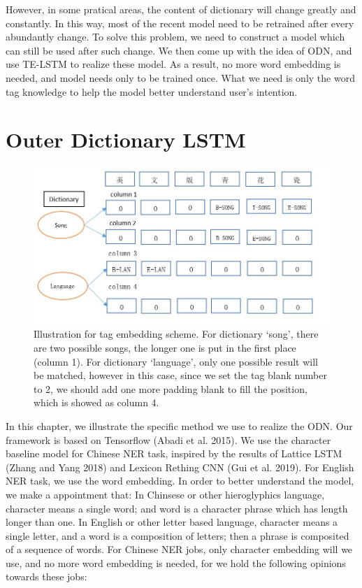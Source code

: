 \documentclass[letterpaper]{article} %
\begin{document}
However, in some pratical areas, the content of dictionary will change greatly and constantly. In this way, most of the recent model need to be retrained after every abundantly change. To solve this problem, we need to construct a model which can still be used after such change. We then come up with the idea of ODN, and use TE-LSTM to realize these model. As a result, no more word embedding is needed, and model needs only to be trained once.  What we need is only the word tag knowledge to help the model better understand user's intention.

\section{Outer Dictionary LSTM}


\begin{figure}[t]
\centering
\includegraphics[width=0.9\columnwidth]{tag_scheme} %
\caption{Illustration for tag embedding scheme. For dictionary `song', there are two possible songs, the longer one is put in the first place (column 1). For dictionary `language', only one possible result will be matched, however in this case, since we set the tag blank number to 2, we should add one more padding blank to fill the position, which is showed as column 4. }
\label{tag_scheme}
\end{figure}

In this chapter, we illustrate the specific method we use to realize the ODN. Our framework is based on Tensorflow (Abadi et al. 2015). We use the character baseline model for Chinese NER task,  inspired by the results of Lattice LSTM (Zhang and Yang 2018) and Lexicon Rething CNN (Gui et al. 2019). For English NER task, we use the word embedding. In order to better understand the model, we make a appointment that: In Chinsese or other hieroglyphics language, character means a single word; and word is a character phrase which has length longer than one. In English or other letter based language, character means a single letter, and a word is a composition of letters; then a phrase is composited of a sequence of words. For Chinese NER jobs, only character embedding will we use, and no more word embedding is needed, for we hold the following opinions towards these jobs:
\end{document}
